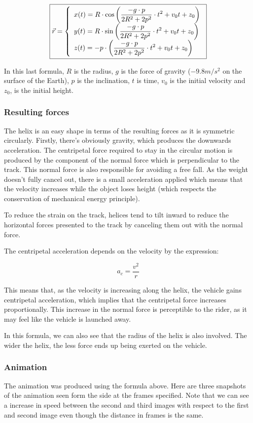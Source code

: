 \documentclass[12pt,twoside,a4paper]{article}
\newcommand{\ds}{\displaystyle}
\begin{document}
	$$\boxed{\ds \vec{r} = \left\{\begin{array}{l}
			\ds x(t) = R \cdot \cos\left(\frac{-g \cdot p}{2R^2 + 2p^2} \cdot t^2 + v_0 t + z_0\right) \cr
			\ds y(t) = R \cdot \sin\left(\frac{-g \cdot p}{2R^2 + 2p^2} \cdot t^2 + v_0 t + z_0\right) \cr
			\ds z(t) = - p \cdot \left(\frac{-g \cdot p}{2R^2 + 2p^2} \cdot t^2 + v_0 t + z_0\right)
		\end{array}\right.}$$
	
	In this last formula, $R$ is the radius, $g$ is the force of gravity ($-9.8 m/s^2$ on the surface of the Earth), $p$ is the inclination, $t$ is time, $v_0$ is the initial velocity and $z_0$, is the initial height.
	
	\subsubsection{Resulting forces}
	The helix is an easy shape in terms of the resulting forces as it is symmetric circularly. Firstly, there's obviously gravity, which produces the downwards acceleration. The centripetal force required to stay in the circular motion is produced by the component of the normal force which is perpendicular to the track. This normal force is also responsible for avoiding a free fall. As the weight doesn't fully cancel out, there is a small acceleration applied which means that the velocity increases while the object loses height (which respects the conservation of mechanical energy principle).
	
	To reduce the strain on the track, helices tend to tilt inward to reduce the horizontal forces presented to the track by canceling them out with the normal force.
	
	The centripetal acceleration depends on the velocity by the expression:
	
	$$a_c = \frac{v^2}{r}$$
	
	This means that, as the velocity is increasing along the helix, the vehicle gains centripetal acceleration, which implies that the centripetal force increases proportionally. This increase in the normal force is perceptible to the rider, as it may feel like the vehicle is launched away.
	
	In this formula, we can also see that the radius of the helix is also involved. The wider the helix, the less force ends up being exerted on the vehicle.
	
	\subsubsection{Animation}
	The animation was produced using the formula above. Here are three snapshots of the animation seen form the side at the frames specified. Note that we can see a increase in speed between the second and third images with respect to the first and second image even though the distance in frames is the same.
	
\end{document}
